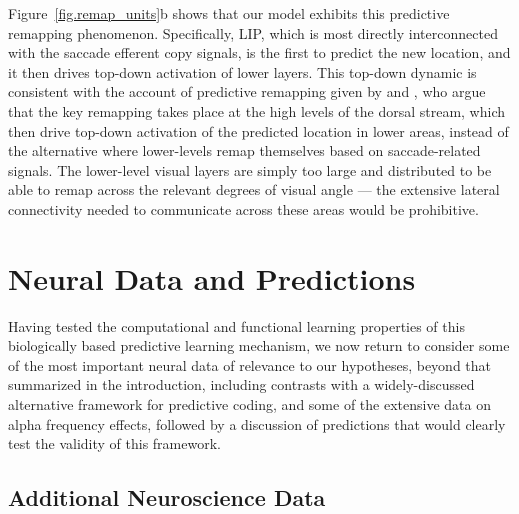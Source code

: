 \documentclass[11pt,twoside]{article}
\newif\myifpdf
\begin{document}
Figure~\ref{fig.remap_units}b shows that our model exhibits this predictive remapping phenomenon.  Specifically, LIP, which is most directly interconnected with the saccade efferent copy signals, is the first to predict the new location, and it then drives top-down activation of lower layers.  This top-down dynamic is consistent with the account of predictive remapping given by \citet{Wurtz08} and \citet{CavanaghHuntAfrazEtAl10}, who argue that the key remapping takes place at the high levels of the dorsal stream, which then drive top-down activation of the predicted location in lower areas, instead of the alternative where lower-levels remap themselves based on saccade-related signals.  The lower-level visual layers are simply too large and distributed to be able to remap across the relevant degrees of visual angle --- the extensive lateral connectivity needed to communicate across these areas would be prohibitive.

\section{Neural Data and Predictions}

Having tested the computational and functional learning properties of this biologically based predictive learning mechanism, we now return to consider some of the most important neural data of relevance to our hypotheses, beyond that summarized in the introduction, including contrasts with a widely-discussed alternative framework for predictive coding, and some of the extensive data on alpha frequency effects, followed by a discussion of predictions that would clearly test the validity of this framework.

\subsection{Additional Neuroscience Data}
\end{document}
